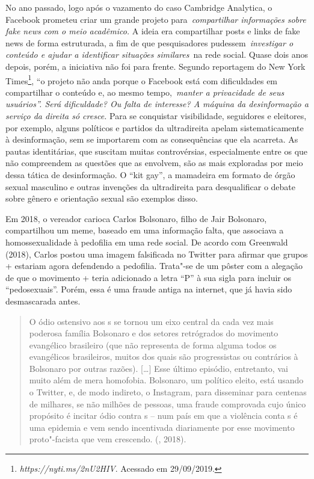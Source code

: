 No ano passado, logo após o vazamento do caso Cambridge Analytica, o
Facebook prometeu criar um grande projeto para~\emph{compartilhar
informações sobre fake news com o meio acadêmico.} A ideia era
compartilhar posts e links de fake news de forma estruturada, a fim de
que pesquisadores pudessem~\emph{investigar o conteúdo e ajudar a
identificar situações similares~}na rede social. Quase dois anos depois,
porém, a iniciativa não foi para frente. Segundo reportagem do New York
Times\footnote{\emph{https://nyti.ms/2nU2HIV}.
  Acessado em 29/09/2019.}, ``o projeto não anda porque o Facebook está
com dificuldades em compartilhar o conteúdo e, ao mesmo
tempo,~\emph{manter a privacidade de seus usuários''. Será
dificuldade? Ou falta de interesse? A máquina da desinformação a serviço
da direita só cresce.} Para se conquistar visibilidade, seguidores e
eleitores, por exemplo, alguns políticos e partidos da ultradireita
apelam sistematicamente à desinformação, sem se importarem com as
consequências que ela acarreta. As pautas identitárias, que suscitam
muitas controvérsias, especialmente entre os que não compreendem as
questões que as envolvem, são as mais exploradas por meio dessa tática
de desinformação. O ``kit gay'', a mamadeira em formato de órgão sexual
masculino e outras invenções da ultradireita para desqualificar o debate
sobre gênero e orientação sexual são exemplos disso.

Em 2018, o vereador carioca Carlos Bolsonaro, filho de Jair Bolsonaro,
compartilhou um meme, baseado em uma informação falta, que associava a
homossexualidade à pedofilia em uma rede social. De acordo com Greenwald
(2018), Carlos postou uma imagem falsificada no Twitter para afirmar que
grupos + estariam agora defendendo a pedofilia. Trata"-se de um
pôster com a alegação de que o movimento + teria adicionado a letra
``P'' à sua sigla para incluir os ``pedosexuais''. Porém, essa é uma
fraude antiga na internet, que já havia sido desmascarada antes.

\begin{quote}
O ódio ostensivo aos s se tornou um eixo central da cada vez mais
poderosa família Bolsonaro e dos setores retrógrados do movimento
evangélico brasileiro (que não representa de forma alguma todos os
evangélicos brasileiros, muitos dos quais são progressistas ou
contrários à Bolsonaro por outras razões). {[}\ldots{}{]} Esse último
episódio, entretanto, vai muito além de mera homofobia. Bolsonaro, um
político eleito, está usando o Twitter, e, de modo indireto, o
Instagram, para disseminar para centenas de milhares, se não milhões de
pessoas, uma fraude comprovada cujo único propósito é incitar ódio
contra s -- num país em que a violência conta s é uma epidemia e
vem sendo incentivada diariamente por esse movimento proto"-facista que
vem crescendo. (, 2018).
\end{quote}

